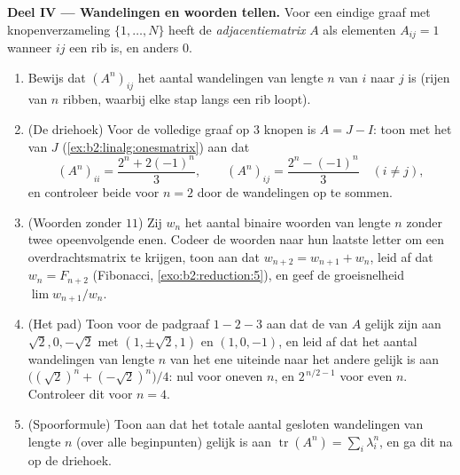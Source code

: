 \begin{problem}
\medskip
\noindent\textbf{Deel IV --- Wandelingen en woorden tellen.} Voor
een eindige graaf met knopenverzameling $\{1, \dots, N\}$ heeft de
\emph{adjacentiematrix} $A$ als elementen $A_{ij} = 1$ wanneer
$ij$ een rib is, en anders $0$.
\begin{enumerate}[resume]
  \item Bewijs dat $(A^n)_{ij}$ het aantal wandelingen van lengte
        $n$ van $i$ naar $j$ is (rijen van $n$ ribben, waarbij elke
        stap langs een rib loopt).
  \item (De driehoek) Voor de volledige graaf op $3$ knopen is $A
        = J - I$: toon met het  van $J$
        (\cref{ex:b2:linalg:onesmatrix}) aan dat
        \[
        (A^n)_{ii} = \frac{2^n + 2(-1)^n}{3},
        \qquad
        (A^n)_{ij} = \frac{2^n - (-1)^n}{3} \quad (i \neq j),
        \]
        en controleer beide voor $n = 2$ door de wandelingen op te
        sommen.
  \item (Woorden zonder $11$) Zij $w_n$ het aantal binaire woorden
        van lengte $n$ zonder twee opeenvolgende enen. Codeer de
        woorden naar hun laatste letter om een overdrachtsmatrix
        te krijgen, toon aan dat $w_{n+2} = w_{n+1} + w_n$, leid
        af dat $w_n = F_{n+2}$ (Fibonacci,
        \cref{exo:b2:reduction:5}), en geef de groeisnelheid
        $\lim w_{n+1}/w_n$.
  \item (Het pad) Toon voor de padgraaf $1 - 2 - 3$ aan dat de
         van $A$ gelijk zijn aan $\sqrt2, 0, -\sqrt2$
        met  $(1, \pm\sqrt2, 1)$ en $(1, 0, -1)$, en
        leid af dat het aantal wandelingen van lengte $n$ van het
        ene uiteinde naar het andere gelijk is aan
        $\bigl((\sqrt2)^n + (-\sqrt2)^n\bigr)/4$: nul voor oneven
        $n$, en $2^{\,n/2 - 1}$ voor even $n$. Controleer dit voor
        $n = 4$.
  \item (Spoorformule) Toon aan dat het totale aantal gesloten
        wandelingen van lengte $n$ (over alle beginpunten) gelijk
        is aan $\operatorname{tr}(A^n) = \sum_i \lambda_i^n$, en
        ga dit na op de driehoek.
\end{enumerate}


\end{problem}
